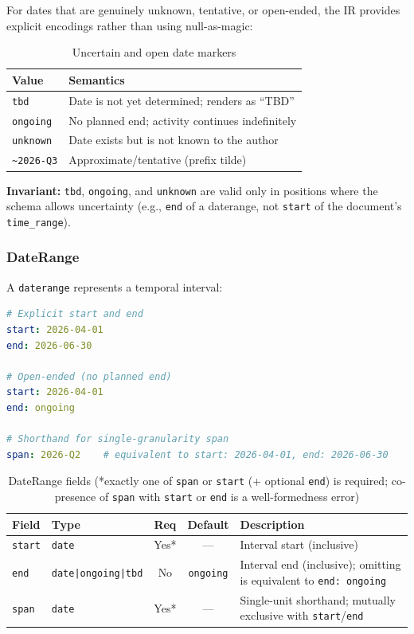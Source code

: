 For dates that are genuinely unknown, tentative, or open-ended, the IR provides explicit
encodings rather than using null-as-magic:

\begin{table}[h]
\centering
\begin{tabular}{lp{8cm}}
\toprule
\textbf{Value} & \textbf{Semantics} \\
\midrule
\texttt{tbd} & Date is not yet determined; renders as ``TBD'' \\
\texttt{ongoing} & No planned end; activity continues indefinitely \\
\texttt{unknown} & Date exists but is not known to the author \\
\texttt{\textasciitilde 2026-Q3} & Approximate/tentative (prefix tilde) \\
\bottomrule
\end{tabular}
\caption{Uncertain and open date markers}
\label{tab:uncertain-dates}
\end{table}

\textbf{Invariant:} \texttt{tbd}, \texttt{ongoing}, and \texttt{unknown} are valid only in
positions where the schema allows uncertainty (e.g., \texttt{end} of a daterange, not
\texttt{start} of the document's \texttt{time\_range}).

\subsubsection{DateRange}

A \texttt{daterange} represents a temporal interval:

\begin{lstlisting}[language=yaml]
# Explicit start and end
start: 2026-04-01
end: 2026-06-30

# Open-ended (no planned end)
start: 2026-04-01
end: ongoing

# Shorthand for single-granularity span
span: 2026-Q2    # equivalent to start: 2026-04-01, end: 2026-06-30
\end{lstlisting}

\begin{table}[h]
\centering
\begin{tabular}{llccp{5cm}}
\toprule
\textbf{Field} & \textbf{Type} & \textbf{Req} & \textbf{Default} & \textbf{Description} \\
\midrule
\texttt{start} & \texttt{date} & Yes* & --- & Interval start (inclusive) \\
\texttt{end} & \texttt{date|ongoing|tbd} & No & \texttt{ongoing} & Interval end (inclusive); omitting is equivalent to \texttt{end: ongoing} \\
\texttt{span} & \texttt{date} & Yes* & --- & Single-unit shorthand; mutually exclusive with \texttt{start}/\texttt{end} \\
\bottomrule
\end{tabular}
\caption{DateRange fields (*exactly one of \texttt{span} or \texttt{start} (+ optional \texttt{end}) is required; co-presence of \texttt{span} with \texttt{start} or \texttt{end} is a well-formedness error)}
\label{tab:daterange-fields}
\end{table}

